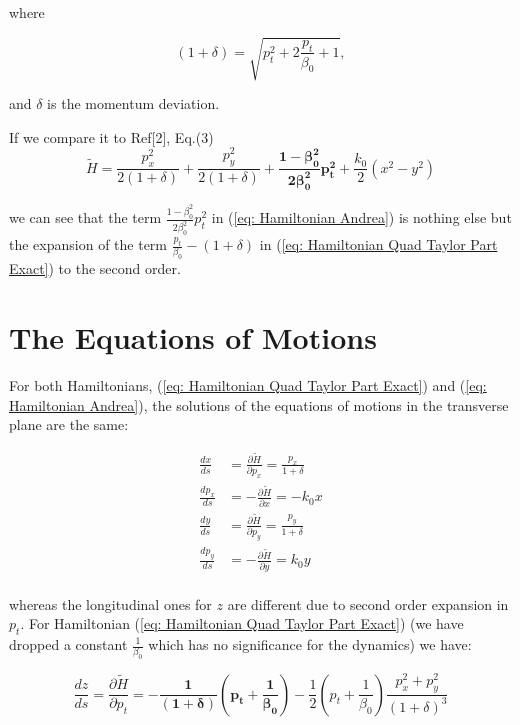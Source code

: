 \documentclass[12pt]{article}
\begin{document}
where 

\begin{equation}
\label{eq: momentum deviation}
(1+\delta) = \sqrt{p_{t}^{2} + 2\frac{p_{t}}{\beta_{0}} + 1},
\end{equation}

and $\delta$ is the momentum deviation. 

If we compare it to Ref[2], Eq.(3)
\begin{equation}
\label{eq: Hamiltonian Andrea}
\tilde{H} = \frac{p_{x}^{2}}{2(1+\delta)} + \frac{p_{y}^{2}}{2(1+\delta)} +  \pmb{\frac{1-\beta_{0}^2}{2\beta_{0}^2}p_{t}^{2}}   +\frac{k_{0}}{2}(x^{2}-y^{2}) 
\end{equation}

we can see that  the term $\frac{1-\beta_{0}^2}{2\beta_{0}^2}p_{t}^{2}$ in (\ref{eq: Hamiltonian Andrea}) is nothing else but the expansion of the term $\frac{p_{t}}{\beta_{0}} - (1+\delta)$  in (\ref{eq: Hamiltonian Quad Taylor Part Exact}) to the second order.

\section{The Equations of Motions}

For both Hamiltonians, (\ref{eq: Hamiltonian Quad Taylor Part Exact}) and (\ref{eq: Hamiltonian Andrea}), the solutions of the equations of motions in the transverse plane are the same:

\begin{align}
\frac{dx}{ds} &= \frac{\partial \tilde{H}}{\partial p_{x}} = \frac{p_{x}}{1+\delta} \nonumber \\
\frac{dp_{x}}{ds} &= -\frac{\partial \tilde{H}}{\partial x} = -k_{0}x \nonumber \\
\frac{dy}{ds} &= \frac{\partial \tilde{H}}{\partial p_{y}} = \frac{p_{y}}{1+\delta} \nonumber \\
\frac{dp_{y}}{ds} &= -\frac{\partial \tilde{H}}{\partial y} = k_{0}y \nonumber \\
\end{align}

whereas the longitudinal ones for $z$ are different due to second order expansion in $p_{t}$. For Hamiltonian (\ref{eq: Hamiltonian Quad Taylor Part Exact}) (we have dropped a constant $\frac{1}{\beta_{0}}$ which has no significance for the dynamics) we have:

\begin{equation}
\label{eq: Motion PT Andy}
\frac{dz}{ds} = \frac{\partial \tilde{H}}{\partial p_{t}} = \pmb{-\frac{1}{(1+\delta)}\left(p_{t} +\frac{1}{\beta_{0}}  \right)}        -      \frac{1}{2}\left(p_{t} + \frac{1}{\beta_{0}}\right)\frac{p_{x}^{2}+ p_{y}^{2}}{(1+\delta)^{3}}     \end{equation}
\end{document}
